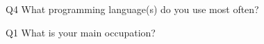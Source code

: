 \begin{description}%
\item{Q4} What programming language(s) do you use most often?%
\item{Q1} What is your main occupation?%
\end{description}%
